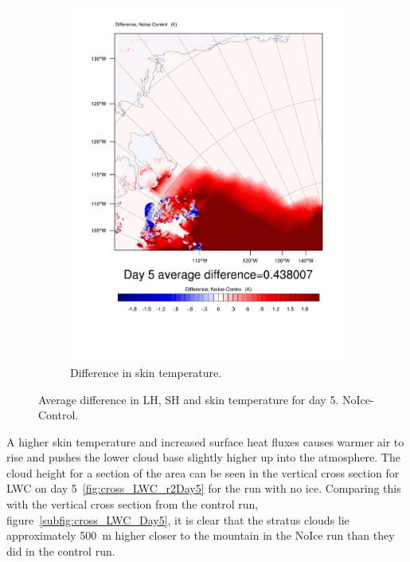 \begin{figure}
	\begin{subfigure}{0.48\textwidth}
		\includegraphics[width=\textwidth]{results/noice/diff_NoIce_skintemp_Day5.pdf}
		\caption{Difference in skin temperature.}
		\label{subfig:skin_r2Day5}
	\end{subfigure}
	\caption{Average difference in LH, SH and skin temperature for day 5. NoIce-Control.}
	\label{fig:lhshskin_r2Day5}
\end{figure}

A higher skin temperature and increased surface heat fluxes causes warmer air to rise and pushes the lower cloud base slightly higher up into the atmosphere. The cloud height for a section of the area can be seen in the vertical cross section for LWC on day 5~\ref{fig:cross_LWC_r2Day5} for the run with no ice. Comparing this with the vertical cross section from the control run, figure~\ref{subfig:cross_LWC_Day5}, it is clear that the stratus clouds lie approximately 500~m higher closer to the mountain in the NoIce run than they did in the control run.

